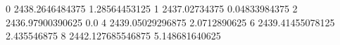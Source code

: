 0 2438.2646484375 1.28564453125
1 2437.02734375 0.04833984375
2 2436.97900390625 0.0
4 2439.05029296875 2.0712890625
6 2439.41455078125 2.435546875
8 2442.127685546875 5.148681640625
